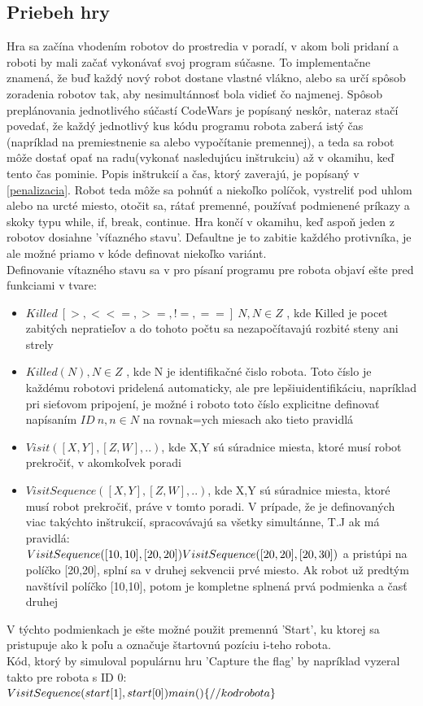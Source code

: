 \subsection {Priebeh hry}
Hra sa začína vhodením robotov do prostredia v poradí, v akom boli pridaní a roboti by mali začať vykonávať svoj program súčasne. To implementačne znamená, že buď každý nový robot dostane vlastné vlákno, alebo sa určí spôsob zoradenia robotov tak, aby nesimultánnosť bola vidieť čo najmenej. Spôsob preplánovania jednotlivého súčastí CodeWars je popísaný neskôr, nateraz stačí povedať, že každý jednotlivý kus kódu programu robota zaberá istý čas (napríklad na premiestnenie sa alebo vypočítanie premennej), a teda sa robot môže dostať opať na radu(vykonať nasledujúcu inštrukciu) až v okamihu, keď tento čas pominie. Popis inštrukcií a čas, ktorý zaverajú, je popísaný v \ref{penalizacia}. Robot teda môže sa pohnúť a niekoľko políčok, vystreliť pod uhlom alebo na urcté miesto, otočit sa, rátať premenné, používať podmienené príkazy a skoky typu while, if, break, continue. Hra končí v okamihu, keď aspoň jeden z robotov dosiahne 'víťazného stavu'. Defaultne je to zabitie každého protivníka, je ale možné priamo v kóde definovat niekoľko variánt.\\
Definovanie vítazného stavu sa v pro písaní programu pre robota objaví ešte pred funkciami v tvare:
\begin{itemize}
\item $Killed\ [>, < <=, >=, !=, ==]\ N, N \in Z$ , kde Killed je pocet zabitých nepratieľov a do tohoto počtu sa nezapočítavajú rozbité steny ani strely
\item $Killed( N ), N \in Z$ , kde N je identifikačné čislo robota. Toto číslo je každému robotovi pridelená automaticky, ale pre lepšiuidentifikáciu, napríklad pri sieťovom pripojení, je možné i roboto toto číslo explicitne definovať napísaním $ ID\ n, n\in N$ na rovnak=ych miesach ako tieto pravidlá
\item $Visit([X,Y], [Z,W],..)$, kde X,Y sú súradnice miesta, ktoré musí robot prekročiť, v akomkoľvek poradi
\item $VisitSequence([X,Y], [Z,W],..)$, kde X,Y sú súradnice miesta, ktoré musí robot prekročiť, práve v tomto poradi. V prípade, že je definovaných viac takýchto inštrukcií, spracovávajú sa všetky simultánne, T.J ak má pravidlá:\\
$VisitSequence([10,10],[20,20])\\VisitSequence([20,20],[20,30])$ a pristúpi na políčko [20,20], splní sa v druhej sekvencii prvé miesto. Ak robot už predtým navštívil políčko [10,10], potom je kompletne splnená prvá podmienka a časť druhej
\end{itemize}
V týchto podmienkach je ešte možné použit premennú 'Start', ku ktorej sa pristupuje ako k poľu a označuje štartovnú pozíciu i-teho robota.\\
Kód, ktorý by simuloval populárnu hru 'Capture the flag' by napríklad vyzeral takto pre robota s ID 0:\\
$VisitSequence(start[1],start[0]) \\ main()\\\{\\//kod robota\\\}\\$
